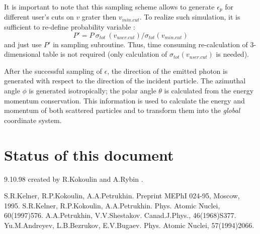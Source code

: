 It is important to note that this sampling scheme allows
to generate $\epsilon_{p}$ for different user's cuts on $v$
grater then $v_{min.cut}$. 
To realize such simulation, it is sufficient to
re-define probability variable :
%
$$P' = P \: \sigma_{tot} \: (v_{user.cut}) / \sigma_{tot} (v_{min.cut})$$
%
and just use $P'$ in sampling subroutine.
Thus, time consuming re-calculation of 3-dimensional table
is not required (only calculation 
of $\sigma_{tot}(v_{user.cut})$ is needed).
  

After the successful sampling of $\epsilon$,  the direction
 of the emitted photon is generated with respect to the direction of the
incident particle. The azimuthal angle $\phi$ is generated isotropically;
the polar angle
$\theta$ is calculated from the energy momentum conservation.
This information
is used to calculate the energy and momentum of both scattered
particles and to transform them into the {\em global} coordinate system.

\section{Status of this document}
 9.10.98 created by R.Kokoulin and A.Rybin .

\begin{thebibliography}{99}

  S.R.Kelner, R.P.Kokoulin, A.A.Petrukhin. Preprint MEPhI 024-95, Moscow, 1995.
  S.R.Kelner, R.P.Kokoulin, A.A.Petrukhin. Phys. Atomic Nuclei, 60(1997)576.
  A.A.Petrukhin, V.V.Shestakov. Canad.J.Phys., 46(1968)S377.
  Yu.M.Andreyev, L.B.Bezrukov, E.V.Bugaev. Phys. Atomic Nuclei, 57(1994)2066.
\end{thebibliography}


